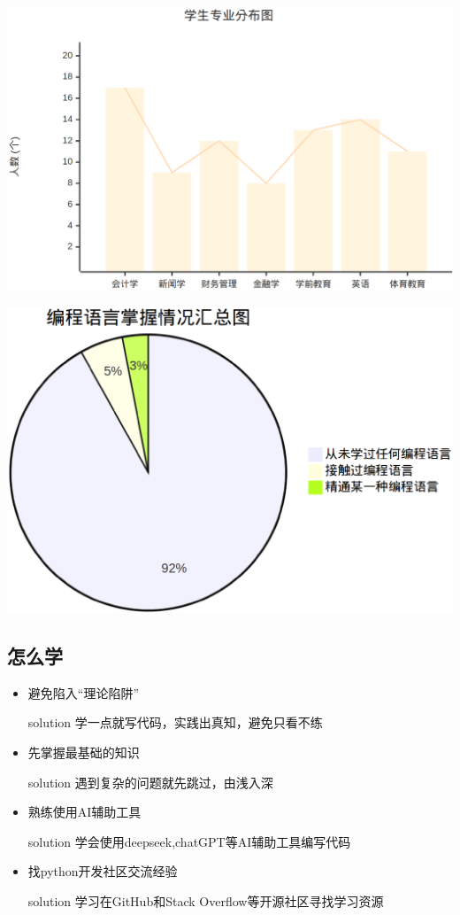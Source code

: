 \documentclass{beamer}
\begin{document}
\begin{frame}[t]
	\begin{center}
		\includegraphics[width=0.6\linewidth]{student_number.eps}
	\end{center}
	\pause
	\begin{center}
		\includegraphics[width=0.4\linewidth]{pie.eps}
	\end{center}
\end{frame}


\subsection{怎么学}

\begin{frame}[t]
	\begin{itemize}
		\item<1-> 避免陷入“理论陷阱”
		      \pause
		      \begin{alertblock}{solution}
			      学一点就写代码，实践出真知，避免只看不练
		      \end{alertblock}
		      \pause
		\item<2-> 先掌握最基础的知识
		      \pause
		      \begin{alertblock}{solution}
			      遇到复杂的问题就先跳过，由浅入深
		      \end{alertblock}
		      \pause
		\item<3-> 熟练使用AI辅助工具
		      \pause
		      \begin{alertblock}{solution}
			      学会使用deepseek,chatGPT等AI辅助工具编写代码
		      \end{alertblock}
		      \pause
		\item<4-> 找python开发社区交流经验
		      \pause
		      \begin{alertblock}{solution}
			      学习在GitHub和Stack Overflow等开源社区寻找学习资源
		      \end{alertblock}



	\end{itemize}

\end{frame}
\end{document}
